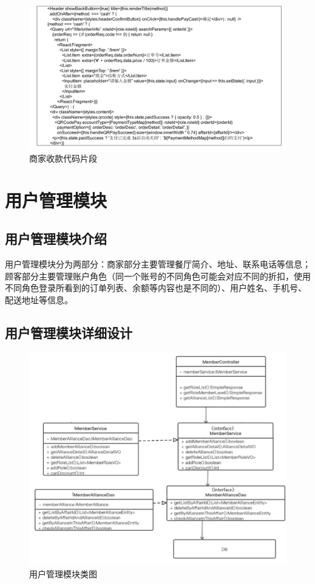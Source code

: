 \begin{figure}[htbp!]
    \centering
    \includegraphics[width=\linewidth]{FIGs/chapter4/3.pdf}
    \caption{商家收款代码片段}\label{fig_pay_3}
\end{figure}

\section{用户管理模块}
\subsection{用户管理模块介绍}
用户管理模块分为两部分：商家部分主要管理餐厅简介、地址、联系电话等信息；顾客部分主要管理账户角色（同一个账号的不同角色可能会对应不同的折扣，使用不同角色登录所看到的订单列表、余额等内容也是不同的）、用户姓名、手机号、配送地址等信息。\\

\subsection{用户管理模块详细设计}
\begin{figure}[htbp!]
    \centering
    \includegraphics[width=5in]{FIGs/chapter4/user.pdf}
    \caption{用户管理模块类图}\label{fig_user}
\end{figure}

